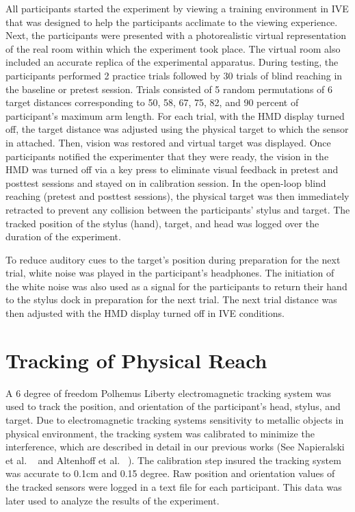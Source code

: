 All participants started the experiment by viewing a training environment in IVE that was designed to help the participants acclimate to the viewing experience. Next, the participants were presented with a photorealistic virtual representation of the real room within which the experiment took place. The virtual room also included an accurate replica of the experimental apparatus. During testing, the participants performed 2 practice trials followed by 30 trials of blind reaching in the baseline or pretest session. Trials consisted of 5 random permutations of 6 target distances corresponding to 50, 58, 67, 75, 82, and 90 percent of participant's maximum arm length. For each trial, with the HMD display turned off, the target distance was adjusted using the physical target to which the sensor in attached. Then, vision was restored and virtual target was displayed. Once participants notified the experimenter that they were ready, the vision in the HMD was turned off via a key press to eliminate visual feedback in pretest and posttest sessions and stayed on in calibration session. In the open-loop blind reaching (pretest and posttest sessions), the physical target was then immediately retracted to prevent any collision between the participants' stylus and target. The tracked position of the stylus (hand), target, and head was logged over the duration of the experiment.

To reduce auditory cues to the target's position during preparation for the next trial, white noise was played in the participant's headphones. The initiation of the white noise was also used as a signal for the participants to return their hand to the stylus dock in preparation for the next trial. The next trial distance was then adjusted with the HMD display turned off in IVE conditions.%

\section{Tracking of Physical Reach}
A 6 degree of freedom Polhemus Liberty electromagnetic tracking system was used to track the position, and orientation of the participant’s head, stylus, and target. %
Due to electromagnetic tracking systems sensitivity to metallic objects in physical environment, the tracking system was calibrated to minimize the interference, which are described in detail in our previous works (See Napieralski et al. ~\cite{NAB+11} and Altenhoff et al. ~\cite{ANL+12}). The calibration step insured the tracking system was accurate to 0.1cm and 0.15 degree. Raw position and orientation values of the tracked sensors were logged in a text file %
for each participant. This data was later used to analyze the results of the experiment.


